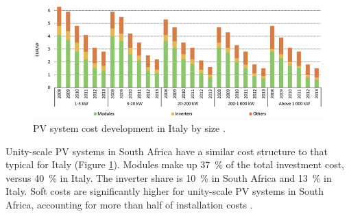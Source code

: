 \begin{figure}[htbp]  
\centering
\includegraphics[width=1\linewidth]{FIG/PVsystemCosts}
\caption[PV system cost development by size.]{PV system cost development in Italy by size \cite{IEA2014c}.}\label{PVsystemCosts}
\end{figure}
Unity-scale \ac{PV} systems in South Africa have a similar cost structure to that typical for Italy (Figure \ref{PVsystemCosts}). Modules make up \SI{37}{\percent} of the total investment cost, versus \SI{40}{\percent} in Italy. The inverter share is \SI{10}{\percent} in South Africa and \SI{13}{\percent} in Italy. Soft costs are significantly higher for unity-scale \ac{PV} systems in South Africa, accounting for more than half of installation costs \cite{IEA2014c,Terblanche2015}.

